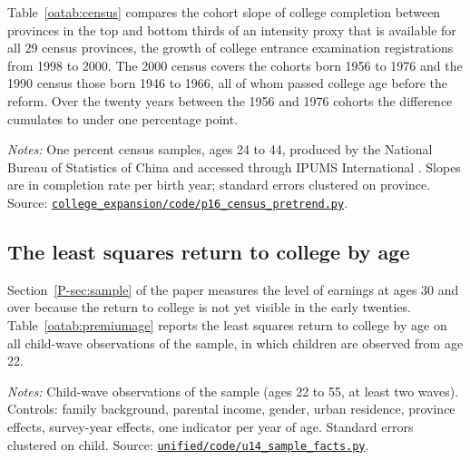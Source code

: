 \documentclass[11pt]{article}
\numberwithin{equation}{section}
\newcommand{\repourl}{https://github.com/JiachenJin1001/before-the-labor-market-or-inside-it}
\newcommand{\code}[1]{\href{\repourl/blob/main/#1}{\nolinkurl{#1}}}
\begin{document}
Table~\ref{oatab:census} compares the cohort slope of college completion between provinces in the top and bottom thirds of an intensity proxy that is available for all 29 census provinces, the growth of college entrance examination registrations from 1998 to 2000. The 2000 census covers the cohorts born 1956 to 1976 and the 1990 census those born 1946 to 1966, all of whom passed college age before the reform. Over the twenty years between the 1956 and 1976 cohorts the difference cumulates to under one percentage point.

\begin{table}[H]
\centering
\small
\caption{Difference in pre-reform cohort slopes of college completion, provinces in the top third of registration growth from 1998 to 2000 against the bottom third.}
\label{oatab:census}

\par\smallskip
\begin{minipage}{0.92\textwidth}
\footnotesize\emph{Notes:} One percent census samples, ages 24 to 44,
produced by the National Bureau of Statistics of China and accessed
through IPUMS International \citep{IPUMSInternational}. Slopes are in
completion rate per birth year; standard errors clustered on province.
Source: \code{college_expansion/code/p16_census_pretrend.py}.
\end{minipage}
\end{table}

\subsection{The least squares return to college by age}

Section~\ref{P-sec:sample} of the paper measures the level of earnings
at ages 30 and over because the return to college is not yet visible in
the early twenties. Table~\ref{oatab:premiumage} reports the least squares return to college by age on all child-wave observations of the sample, in which children are observed from age 22.

\begin{table}[H]
\centering
\small
\caption{The least squares return to college by age at observation.}
\label{oatab:premiumage}

\par\smallskip
\begin{minipage}{0.92\textwidth}
\footnotesize\emph{Notes:} Child-wave observations of the sample (ages 22 to 55, at least two waves). Controls: family background,
parental income, gender, urban residence, province effects, survey-year
effects, one indicator per year of age. Standard errors clustered on
child. Source: \code{unified/code/u14_sample_facts.py}.
\end{minipage}
\end{table}
\end{document}
